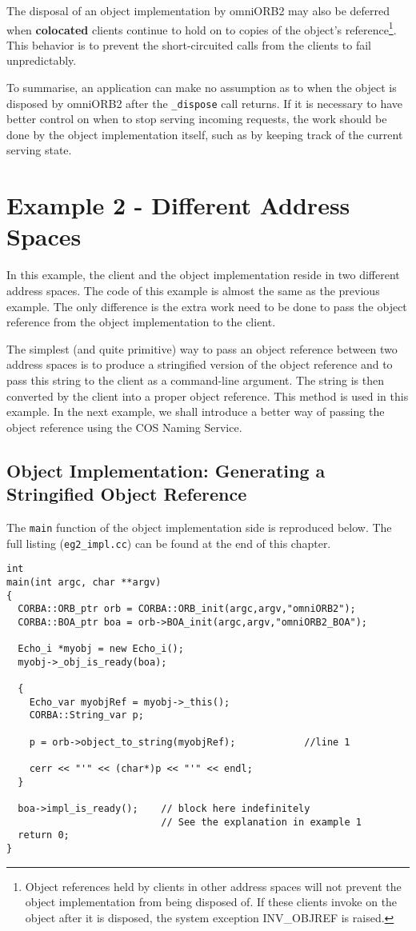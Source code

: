 \documentclass[11pt,twoside,onecolumn]{book}
\begin{document}
The disposal of an object implementation by omniORB2 may also be deferred
when {\bf colocated} clients continue to hold on to copies of the object's
reference\footnote{Object references held by clients in other address
spaces will not prevent the object implementation from being disposed
of. If these clients invoke on the object after it is disposed, the system
exception INV\_OBJREF is raised.}. This behavior is to prevent the
short-circuited calls from the clients to fail unpredictably.

To summarise, an application can make no assumption as to when the object
is disposed by omniORB2 after the {\tt \_dispose} call returns. If it is
necessary to have better control on when to stop serving incoming
requests, the work should be done by the object implementation itself, such
as by keeping track of the current serving state.

\section{Example 2 - Different Address Spaces}

In this example, the client and the object implementation reside in two
different address spaces. The code of this example is almost the same as the
previous example. The only difference is the extra work need to be done to
pass the object reference from the object implementation to the client.

The simplest (and quite primitive) way to pass an object reference between
two address spaces is to produce a stringified version of the object
reference and to pass this string to the client as a command-line argument.
The string is then converted by the client into a proper object reference.
This method is used in this example. In the next example, we shall
introduce a better way of passing the object reference using the COS Naming
Service.

\subsection{Object Implementation: Generating a Stringified Object Reference}

The {\tt main} function of the object implementation side is reproduced
below. The full listing ({\tt eg2\_impl.cc}) can be found at the end of
this chapter.

{\small
\begin{verbatim}
int
main(int argc, char **argv)
{
  CORBA::ORB_ptr orb = CORBA::ORB_init(argc,argv,"omniORB2");
  CORBA::BOA_ptr boa = orb->BOA_init(argc,argv,"omniORB2_BOA");

  Echo_i *myobj = new Echo_i();
  myobj->_obj_is_ready(boa);

  {
    Echo_var myobjRef = myobj->_this();
    CORBA::String_var p;

    p = orb->object_to_string(myobjRef);            //line 1

    cerr << "'" << (char*)p << "'" << endl;
  }

  boa->impl_is_ready();    // block here indefinitely
                           // See the explanation in example 1
  return 0;
}
\end{verbatim}
}
\end{document}
